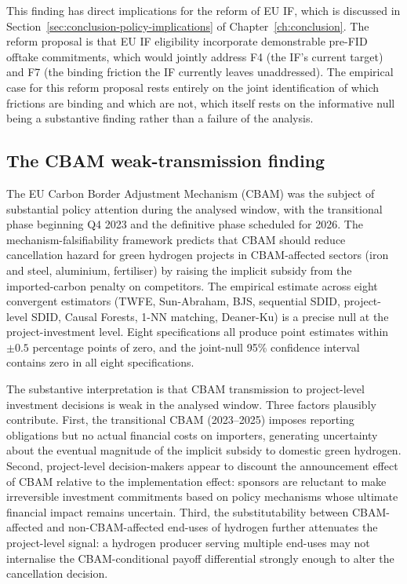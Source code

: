 This finding has direct implications for the reform of EU IF, which is discussed in Section~\ref{sec:conclusion-policy-implications} of Chapter~\ref{ch:conclusion}. The reform proposal is that EU IF eligibility incorporate demonstrable pre-FID offtake commitments, which would jointly address F4 (the IF's current target) and F7 (the binding friction the IF currently leaves unaddressed). The empirical case for this reform proposal rests entirely on the joint identification of which frictions are binding and which are not, which itself rests on the informative null being a substantive finding rather than a failure of the analysis.

\subsection{The CBAM weak-transmission finding}
\label{sec:ch10-cbam-null}

The EU Carbon Border Adjustment Mechanism (CBAM) was the subject of substantial policy attention during the analysed window, with the transitional phase beginning Q4 2023 and the definitive phase scheduled for 2026. The mechanism-falsifiability framework predicts that CBAM should reduce cancellation hazard for green hydrogen projects in CBAM-affected sectors (iron and steel, aluminium, fertiliser) by raising the implicit subsidy from the imported-carbon penalty on competitors. The empirical estimate across eight convergent estimators (TWFE, Sun-Abraham, BJS, sequential SDID, project-level SDID, Causal Forests, 1-NN matching, Deaner-Ku) is a precise null at the project-investment level. Eight specifications all produce point estimates within $\pm 0.5$ percentage points of zero, and the joint-null 95\% confidence interval contains zero in all eight specifications.

The substantive interpretation is that CBAM transmission to project-level investment decisions is weak in the analysed window. Three factors plausibly contribute. First, the transitional CBAM (2023--2025) imposes reporting obligations but no actual financial costs on importers, generating uncertainty about the eventual magnitude of the implicit subsidy to domestic green hydrogen. Second, project-level decision-makers appear to discount the announcement effect of CBAM relative to the implementation effect: sponsors are reluctant to make irreversible investment commitments based on policy mechanisms whose ultimate financial impact remains uncertain. Third, the substitutability between CBAM-affected and non-CBAM-affected end-uses of hydrogen further attenuates the project-level signal: a hydrogen producer serving multiple end-uses may not internalise the CBAM-conditional payoff differential strongly enough to alter the cancellation decision.

